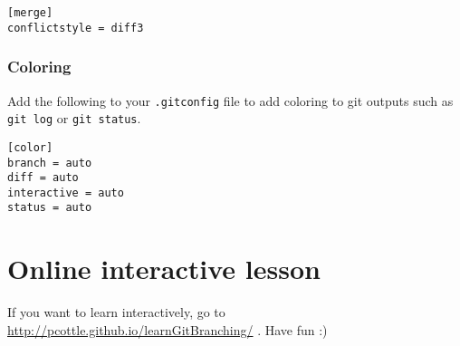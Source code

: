 \documentclass[12pt]{article}
\begin{document}
\texttt{[merge]\\
conflictstyle = diff3 }

\subsubsection{Coloring}
Add the following to your \texttt{.gitconfig} file to add coloring to git outputs such as \texttt{git log} or \texttt{git status}.

\texttt{[color]\\
  branch = auto\\
  diff = auto\\
  interactive = auto\\
  status = auto }

\section{Online interactive lesson}
If you want to learn interactively, go to \url{http://pcottle.github.io/learnGitBranching/} . Have fun :)
\end{document}
